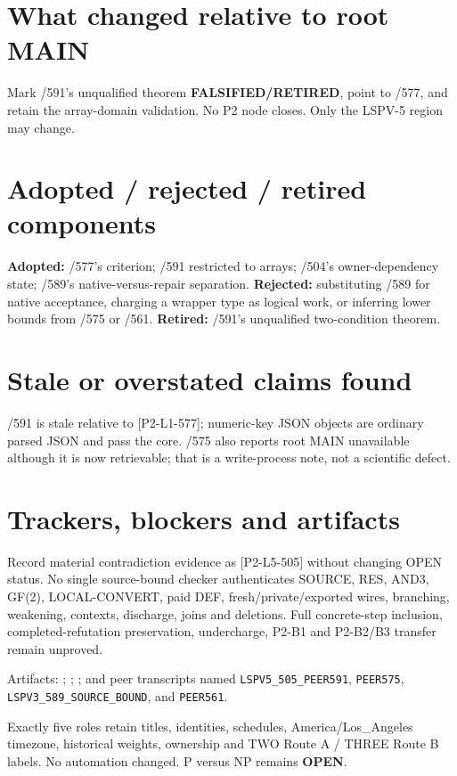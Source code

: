 \documentclass[10pt]{article}
\begin{document}
\section*{What changed relative to root MAIN}
Mark /591's unqualified theorem \textbf{FALSIFIED/RETIRED}, point to /577, and retain the
array-domain validation.  No P2 node closes.  Only the LSPV-5 region may change.

\section*{Adopted / rejected / retired components}
\textbf{Adopted:} /577's criterion; /591 restricted to arrays; /504's owner-dependency state;
/589's native-versus-repair separation.  \textbf{Rejected:} substituting /589 for native
acceptance, charging a wrapper type as logical work, or inferring lower bounds from /575 or /561.
\textbf{Retired:} /591's unqualified two-condition theorem.

\section*{Stale or overstated claims found}
/591 is stale relative to [P2-L1-577]; numeric-key JSON objects are ordinary parsed JSON and
pass the core.  /575 also reports root MAIN unavailable although it is now retrievable; that is
a write-process note, not a scientific defect.

\section*{Trackers, blockers and artifacts}
Record material contradiction evidence as [P2-L5-505] without changing OPEN status.
No single source-bound checker authenticates SOURCE, RES, AND3, GF(2), LOCAL-CONVERT, paid DEF,
fresh/private/exported wires, branching, weakening, contexts, discharge, joins and deletions.
Full concrete-step inclusion, completed-refutation preservation, undercharge, P2-B1 and
P2-B2/B3 transfer remain unproved.

Artifacts:
;
;
;
and peer transcripts named \texttt{LSPV5\_505\_PEER591}, \texttt{PEER575},
\texttt{LSPV3\_589\_SOURCE\_BOUND}, and \texttt{PEER561}.

Exactly five roles retain titles, identities, schedules, America/Los\_Angeles timezone,
historical weights, ownership and TWO Route A / THREE Route B labels.  No automation changed.
P versus NP remains \textbf{OPEN}.
\end{document}
